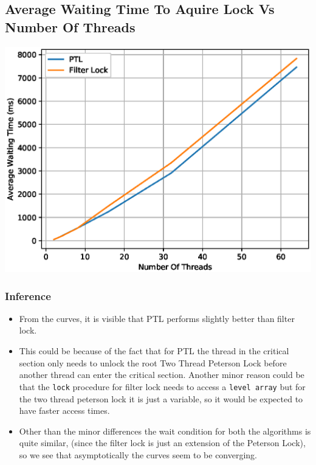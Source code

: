 \documentclass[a4paper,12pt]{report}
\begin{document}
\subsection{Average Waiting Time To Aquire Lock Vs Number Of Threads}
\begin{center}
\includegraphics[scale=0.7]{./w.eps}
\end{center}
\subsubsection{Inference}
\begin{itemize}
\item From the curves, it is visible that PTL performs slightly better than filter lock. \item This could be because of the fact that for PTL the thread in the critical section only needs to unlock the root Two Thread Peterson Lock before another thread can enter the critical section. Another minor reason could be that the \texttt{lock} procedure for filter lock needs to access a \texttt{level array} but for the two thread peterson lock it is just a variable, so it would be expected to have faster access times.
\item Other than the minor differences the wait condition for both the algorithms is quite similar, (since the filter lock is just an extension of the Peterson Lock), so we see that asymptotically the curves seem to be converging.
\end{itemize}
\end{document}
